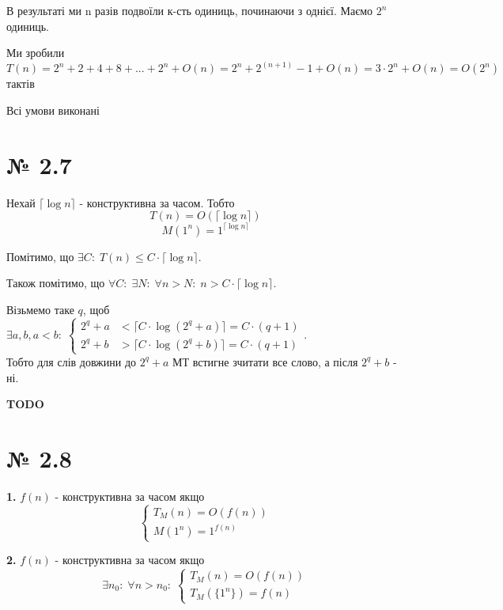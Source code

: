 \documentclass[11pt, a4paper]{article} %
\begin{document}
В результаті ми n разів подвоїли к-сть одиниць, починаючи з однієї. 
Маємо $2^n$ одиниць.

Ми зробили 
$$
T(n) = 2^n + 2 + 4 + 8 + ... + 2^n + O(n) = 2^n + 2^{(n+1)}-1 + O(n) = 3 \cdot 2^n + O(n) = O(2^n) 
$$
тактів

Всі умови виконані \qedsymbol

\section*{№ 2.7}
Нехай $\lceil \log n \rceil$ - конструктивна за часом. 
Тобто
$$T(n) = O(\lceil \log n \rceil)$$
$$M(1^n) = 1^{\lceil \log n \rceil}$$

Помітимо, що $\exists C:\; T(n) \le C \cdot \lceil \log n \rceil$.

Також помітимо, що $\forall C:\; \exists N:\; \forall n>N:\; n > C \cdot \lceil \log n \rceil$.

Візьмемо таке $q$, щоб $\exists a,b, a<b:\; \begin{cases}
    2^q+a &< \lceil C \cdot \log (2^q+a) \rceil = C \cdot (q+1) \\
    2^q+b &> \lceil C \cdot \log (2^q+b) \rceil = C \cdot (q+1)
\end{cases}$.\\

Тобто для слів довжини до $2^q+a$ МТ встигне зчитати все слово, а після $2^q+b$ - ні.



\textbf{TODO}



\section*{№ 2.8}
\begin{mdframed}
    \textbf{1.} $f(n)$ - конструктивна за часом якщо
    $$
    \begin{cases}
        T_M(n) = O(f(n)) \\
        M(1^n) = 1^{f(n)}
    \end{cases}
    $$
\end{mdframed}

\begin{mdframed}
    \textbf{2.} $f(n)$ - конструктивна за часом якщо
    $$ \exists n_0:\; \forall n > n_0:\;
    \begin{cases}
        T_M(n) = O(f(n)) \\
        T_M(\{1^n\}) = f(n)
    \end{cases}
    $$
\end{mdframed}
\end{document}
